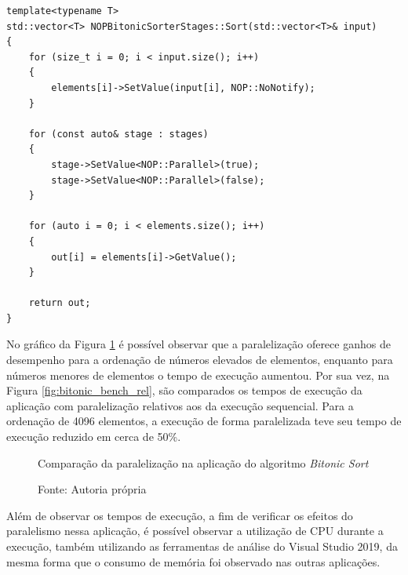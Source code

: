 \begin{lstlisting}[caption = {\textit{Bitonic Sort} paralelizado com o \textit{Framework} PON C++ 4.0},
  source = {Autoria própria}, float=htb,
  label = {cod:fn_sort_p},
]
template<typename T>
std::vector<T> NOPBitonicSorterStages::Sort(std::vector<T>& input)
{
    for (size_t i = 0; i < input.size(); i++)
    {
        elements[i]->SetValue(input[i], NOP::NoNotify);
    }

    for (const auto& stage : stages)
    {
        stage->SetValue<NOP::Parallel>(true);
        stage->SetValue<NOP::Parallel>(false);
    }

    for (auto i = 0; i < elements.size(); i++)
    {
        out[i] = elements[i]->GetValue();
    }

    return out;
}
\end{lstlisting}

No gráfico da Figura \ref{fig:bitonic_par} é possível observar que a
paralelização oferece ganhos de desempenho para a ordenação de números elevados
de elementos, enquanto para números menores de elementos o tempo de execução
aumentou. Por sua vez, na Figura \ref{fig:bitonic_bench_rel}, são comparados os
tempos de execução da aplicação com paralelização relativos aos da execução
sequencial. Para a ordenação de 4096 elementos, a execução de forma
paralelizada teve seu tempo de execução reduzido em cerca de 50\%. 

\begin{figure}[!htb]
\centering
{}
\caption{Comparação da paralelização na aplicação do algoritmo \textit{Bitonic
Sort}}
\caption*{Fonte: Autoria própria}
\label{fig:bitonic_par}
\end{figure}

Além de observar os tempos de execução, a fim de verificar os efeitos do
paralelismo nessa aplicação, é possível observar a utilização de CPU durante a
execução, também utilizando as ferramentas de análise do Visual Studio 2019, da
mesma forma que o consumo de memória foi observado nas outras aplicações. 

